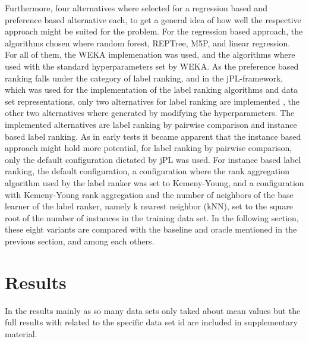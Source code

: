Furthermore, four alternatives where selected for a regression based and preference based alternative each, to get a general idea of how well the respective approach might be suited for the problem. For the regression based approach, the algorithms chosen where random forest, REPTree, M5P, and linear regression. For all of them, the WEKA implemenation \cite{hall2009weka} was used, and the algorithms where used with the standard hyperparameters set by WEKA. As the preference based ranking falls under the category of label ranking, and in the jPL-framework, which was used for the implementation of the label ranking algorithms and data set representations, only two alternatives for label ranking are implemented \cite{intelligent2017jpl}, the other two alternatives where generated by modifying the hyperparameters. The implemented alternatives are label ranking by pairwise comparison and instance based label ranking. As in early tests it became apparent that the instance based approach might hold more potential, for label ranking by pairwise comparison, only the default configuration dictated by jPL was used. For instance based label ranking, the default configuration, a configuration where the rank aggregation algorithm used by the label ranker was set to Kemeny-Young, and a configuration with Kemeny-Young rank aggregation and the number of neighbors of the base learner of the label ranker, namely k nearest neighbor (kNN), set to the square root of the number of instances in the training data set. In the following section, these eight variants are compared with the baseline and oracle mentioned in the previous section, and among each others.

\section{Results}

In the results mainly as so many data sets only taked about mean values but the full results with related to the specific data set id are included in supplementary material.



